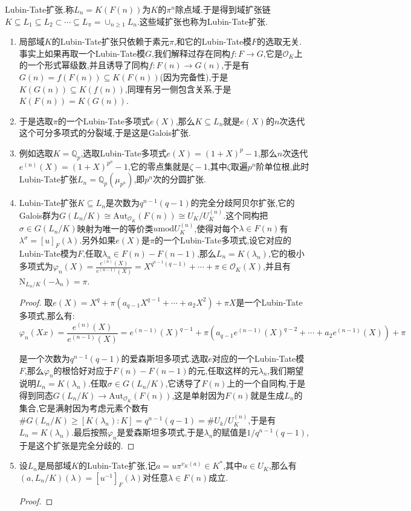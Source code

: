 Lubin-Tate扩张.称$L_n=K(F(n))$为$K$的$\pi^n$除点域.于是得到域扩张链$K\subseteq L_1\subseteq L_2\subset\cdots\subseteq L_{\pi}=\cup_{n\ge1}L_n$.这些域扩张也称为Lubin-Tate扩张.
\begin{enumerate}
	\item 局部域$K$的Lubin-Tate扩张只依赖于素元$\pi$,和它的Lubin-Tate模$F$的选取无关.事实上如果再取一个Lubin-Tate模$G$,我们解释过存在同构$f:F\to G$,它是$\mathscr{O}_K$上的一个形式幂级数,并且诱导了同构$f:F(n)\to G(n)$,于是有$G(n)=f(F(n))\subseteq K(F(n))$(因为完备性),于是$K(G(n))\subseteq K(f(n))$,同理有另一侧包含关系,于是$K(F(n))=K(G(n))$.
	\item 于是选取$\pi$的一个Lubin-Tate多项式$e(X)$,那么$K\subseteq L_n$就是$e(X)$的$n$次迭代这个可分多项式的分裂域,于是这是Galois扩张.
	\item 例如选取$K=\mathbb{Q}_p$,选取Lubin-Tate多项式$e(X)=(1+X)^p-1$,那么$n$次迭代$e^{(n)}(X)=(1+X)^{p^n}-1$,它的零点集就是$\zeta-1$,其中$\zeta$取遍$p^n$阶单位根,此时Lubin-Tate扩张$L_n=\mathbb{Q}_p(\mu_{p^n})$,即$p^n$次的分圆扩张.
	\item Lubin-Tate扩张$K\subseteq L_n$是次数为$q^{n-1}(q-1)$的完全分歧阿贝尔扩张,它的Galois群为$G(L_n/K)\cong\mathrm{Aut}_{\mathscr{O}_K}(F(n))\cong U_K/U_K^{(n)}$.这个同构把$\sigma\in G(L_n/K)$映射为唯一的等价类$u\mathrm{mod}U_K^{(n)}$,使得对每个$\lambda\in F(n)$有$\lambda^{\sigma}=[u]_F(\lambda)$.另外如果$e(X)$是$\pi$的一个Lubin-Tate多项式,设它对应的Lubin-Tate模为$F$,任取$\lambda_n\in F(n)-F(n-1)$,那么$L_n=K(\lambda_n)$,它的极小多项式为$\varphi_n(X)=\frac{e^{(n)}(X)}{e^{(n-1)}(X)}=X^{q^{n-1}(q-1)}+\cdots+\pi\in\mathscr{O}_K(X)$,并且有$\mathrm{N}_{L_n/K}(-\lambda_n)=\pi$.
	\begin{proof}
		
		取$e(X)=X^q+\pi(a_{q-1}X^{q-1}+\cdots+a_2X^2)+\pi X$是一个Lubin-Tate多项式,那么有:
		$$\varphi_n(Xx)=\frac{e^{(n)}(X)}{e^{(n-1)}(X)}=e^{(n-1)}(X)^{q-1}+\pi\left(a_{q-1}e^{(n-1)}(X)^{q-2}+\cdots+a_2e^{(n-1)}(X)\right)+\pi$$
		
		是一个次数为$q^{n-1}(q-1)$的爱森斯坦多项式.选取$e$对应的一个Lubin-Tate模$F$,那么$\varphi_n$的根恰好对应于$F(n)-F(n-1)$的元,任取这样的元$\lambda_n$,我们期望说明$L_n=K(\lambda_n)$.任取$\sigma\in G(L_n/K)$,它诱导了$F(n)$上的一个自同构,于是得到同态$G(L_n/K)\to\mathrm{Aut}_{\mathscr{O}_K}(F(n))$,这是单射因为$F(n)$就是生成$L_n$的集合,它是满射因为考虑元素个数有$\#G(L_n/K)\ge[K(\lambda_n):K]=q^{n-1}(q-1)=\#U_k/U_K^{(n)}$,于是有$L_n=K(\lambda_n)$.最后按照$\varphi_n$是爱森斯坦多项式,于是$\lambda_n$的赋值是$1/q^{n-1}(q-1)$,于是这个扩张是完全分歧的.
	\end{proof}
	\item 设$L_n$是局部域$K$的Lubin-Tate扩张,记$a=u\pi^{v_K(a)}\in K^*$,其中$u\in U_K$,那么有$(a,L_n/K)(\lambda)=[u^{-1}]_F(\lambda)$对任意$\lambda\in F(n)$成立.
	\begin{proof}
		

\end{proof}
\end{enumerate}

